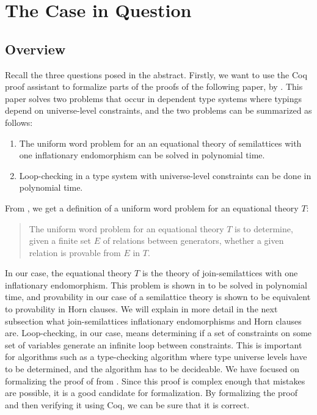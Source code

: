 \chapter{The Case in Question}
\label{ch:the_case_in_question}

\section{Overview}
\label{sec:overview}

Recall the three questions posed in the abstract.
Firstly, we want to use the Coq proof assistant to formalize parts of the proofs of the following paper, by \citeauthor{mbezem} \cite{mbezem}.
This paper solves two problems that occur in dependent type systems where typings depend
on universe-level constraints, and the two problems can be summarized as follows:

\begin{enumerate}
    \item The uniform word problem for an an equational theory of semilattices
          with one inflationary endomorphism can be solved in polynomial time.
    \item Loop-checking in a type system with universe-level constraints
          can be done in polynomial time.
\end{enumerate}

From \cite{mbezem}, we get a definition of a uniform word problem for an equational theory $T$:

\begin{quote}
The uniform word problem for an equational theory $T$ is to determine,
given a finite set $E$ of relations between generators,
whether a given relation is provable from $E$ in $T$.
\end{quote}
In our case, the equational theory $T$ is the theory of join-semilattices
with one inflationary endomorphism.
This problem is shown in \cite{mbezem} to be solved in polynomial time,
and provability in our case of a semilattice theory is shown to be equivalent to
provability in Horn clauses.
We will explain in more detail in the next subsection what join-semilattices
inflationary endomorphisms and Horn clauses are.
Loop-checking, in our case, means determining if a set of constraints
on some set of variables generate an infinite loop between constraints.
This is important for algorithms such as a type-checking algorithm where
type universe levels have to be determined, and the algorithm has to be decideable.
We have focused on formalizing the proof of  from \cite{mbezem}.
Since this proof is complex enough that mistakes are possible, it is a good candidate for formalization.
By formalizing the proof and then verifying it using Coq, we can be sure that it is correct.

